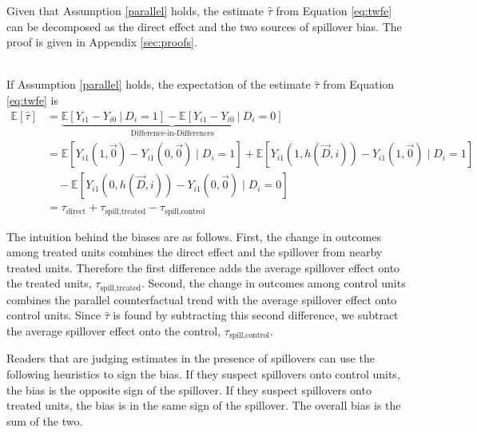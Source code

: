 \documentclass[11pt]{article}
\begin{document}
Given that Assumption \ref{parallel} holds, the estimate $\hat{\tau}$ from Equation \ref{eq:twfe} can be decomposed as the direct effect and the two sources of spillover bias. The proof is given in Appendix \ref{sec:proofs}.

\begin{theorem}\label{thm:bias}\ \\    
    If Assumption \ref{parallel} holds, the expectation of the estimate $\hat{\tau}$ from Equation \ref{eq:twfe} is
    \begin{align*}
        \mathbb{E}[\hat{\tau}] &= \underbrace{\mathbb{E}\left[ Y_{i1} - Y_{i0} \ \vert \ D_i = 1 \right] - \mathbb{E}\left[ Y_{i1} - Y_{i0} \ \vert \ D_i = 0 \right]}_{\text{Difference-in-Differences}} \\ 
        &= 
        \mathbb{E} \left[ Y_{i1}(1, \vec{0}) - Y_{i1}(0, \vec{0}) \mid D_i = 1 \right] + \mathbb{E} \left[ Y_{i1}(1, h(\vec{D}, i)) - Y_{i1}(1, \vec{0}) \mid D_i = 1 \right] \\
        &\quad - \mathbb{E} \left[ Y_{i1}(0, h(\vec{D}, i)) - Y_{i1}(0, \vec{0}) \mid D_i = 0 \right] \\
        &= \tau_{\text{direct}} + \tau_{\text{spill,treated}} - \tau_{\text{spill,control}}
    \end{align*}
\end{theorem}

The intuition behind the biases are as follows. First, the change in outcomes among treated units combines the direct effect and the spillover from nearby treated units. Therefore the first difference adds the average spillover effect onto the treated units, $\tau_{\text{spill,treated}}$. Second, the change in outcomes among control units combines the parallel counterfactual trend with the average spillover effect onto control units. Since $\hat{\tau}$ is found by subtracting this second difference, we subtract the average spillover effect onto the control, $\tau_{\text{spill,control}}$. 

Readers that are judging estimates in the presence of spillovers can use the following heuristics to sign the bias. If they suspect spillovers onto control units, the bias is the opposite sign of the spillover. If they suspect spillovers onto treated units, the bias is in the same sign of the spillover. The overall bias is the sum of the two.



\end{document}
